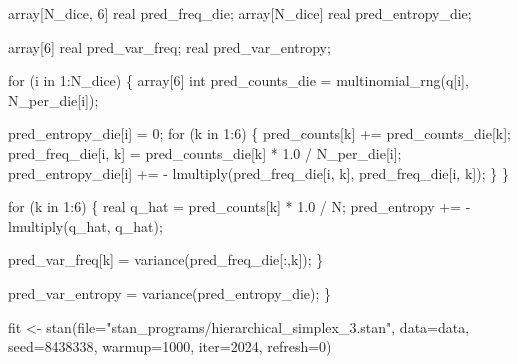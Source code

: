 \documentclass[
  letterpaper,
  DIV=11,
  numbers=noendperiod]{scrartcl}
\newenvironment{Shaded}{\begin{snugshade}}{\end{snugshade}}
\newcommand{\AttributeTok}[1]{\textcolor[rgb]{0.40,0.45,0.13}{#1}}
\newcommand{\ControlFlowTok}[1]{\textcolor[rgb]{0.00,0.23,0.31}{#1}}
\newcommand{\DataTypeTok}[1]{\textcolor[rgb]{0.68,0.00,0.00}{#1}}
\newcommand{\DecValTok}[1]{\textcolor[rgb]{0.68,0.00,0.00}{#1}}
\newcommand{\FloatTok}[1]{\textcolor[rgb]{0.68,0.00,0.00}{#1}}
\newcommand{\FunctionTok}[1]{\textcolor[rgb]{0.28,0.35,0.67}{#1}}
\newcommand{\NormalTok}[1]{\textcolor[rgb]{0.00,0.23,0.31}{#1}}
\newcommand{\OtherTok}[1]{\textcolor[rgb]{0.00,0.23,0.31}{#1}}
\newcommand{\StringTok}[1]{\textcolor[rgb]{0.13,0.47,0.30}{#1}}
\begin{document}
\begin{codelisting}
\begin{Shaded}
\begin{Highlighting}[]
  \DataTypeTok{array}\NormalTok{[N\_dice, }\DecValTok{6}\NormalTok{] }\DataTypeTok{real}\NormalTok{ pred\_freq\_die;}
  \DataTypeTok{array}\NormalTok{[N\_dice] }\DataTypeTok{real}\NormalTok{ pred\_entropy\_die;}

  \DataTypeTok{array}\NormalTok{[}\DecValTok{6}\NormalTok{] }\DataTypeTok{real}\NormalTok{ pred\_var\_freq;}
  \DataTypeTok{real}\NormalTok{ pred\_var\_entropy;}

  \ControlFlowTok{for}\NormalTok{ (i }\ControlFlowTok{in} \DecValTok{1}\NormalTok{:N\_dice) \{}
    \DataTypeTok{array}\NormalTok{[}\DecValTok{6}\NormalTok{] }\DataTypeTok{int}\NormalTok{ pred\_counts\_die = multinomial\_rng(q[i], N\_per\_die[i]);}

\NormalTok{    pred\_entropy\_die[i] = }\DecValTok{0}\NormalTok{;}
    \ControlFlowTok{for}\NormalTok{ (k }\ControlFlowTok{in} \DecValTok{1}\NormalTok{:}\DecValTok{6}\NormalTok{) \{}
\NormalTok{      pred\_counts[k] += pred\_counts\_die[k];}
\NormalTok{      pred\_freq\_die[i, k] = pred\_counts\_die[k] * }\FloatTok{1.0}\NormalTok{ / N\_per\_die[i];}
\NormalTok{      pred\_entropy\_die[i] += {-} lmultiply(pred\_freq\_die[i, k],}
\NormalTok{                                         pred\_freq\_die[i, k]);}
\NormalTok{    \}}
\NormalTok{  \}}

  \ControlFlowTok{for}\NormalTok{ (k }\ControlFlowTok{in} \DecValTok{1}\NormalTok{:}\DecValTok{6}\NormalTok{) \{}
    \DataTypeTok{real}\NormalTok{ q\_hat = pred\_counts[k] * }\FloatTok{1.0}\NormalTok{ / N;}
\NormalTok{    pred\_entropy += {-} lmultiply(q\_hat, q\_hat);}

\NormalTok{    pred\_var\_freq[k] = variance(pred\_freq\_die[:,k]);}
\NormalTok{  \}}

\NormalTok{  pred\_var\_entropy = variance(pred\_entropy\_die);}
\NormalTok{\}}
\end{Highlighting}
\end{Shaded}

\end{codelisting}

\begin{Shaded}
\begin{Highlighting}[]
\NormalTok{fit }\OtherTok{\textless{}{-}} \FunctionTok{stan}\NormalTok{(}\AttributeTok{file=}\StringTok{"stan\_programs/hierarchical\_simplex\_3.stan"}\NormalTok{,}
            \AttributeTok{data=}\NormalTok{data, }\AttributeTok{seed=}\DecValTok{8438338}\NormalTok{,}
            \AttributeTok{warmup=}\DecValTok{1000}\NormalTok{, }\AttributeTok{iter=}\DecValTok{2024}\NormalTok{, }\AttributeTok{refresh=}\DecValTok{0}\NormalTok{)}
\end{Highlighting}
\end{Shaded}
\end{document}
